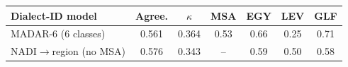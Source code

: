 \begin{tabular}{lcc|cccc}
\toprule
\textbf{Dialect-ID model} & Agree. & $\kappa$ & MSA & EGY & LEV & GLF \\
\midrule
MADAR-6 (6 classes) & 0.561 & 0.364 & 0.53 & 0.66 & 0.25 & 0.71 \\
NADI$\rightarrow$region (no MSA) & 0.576 & 0.343 & -- & 0.59 & 0.50 & 0.58 \\
\bottomrule
\end{tabular}
